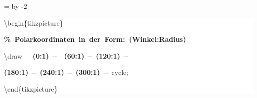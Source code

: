 \begingroup
\ttfamily
{}
=\textwidth
\advance{} by -2\fboxsep
\noindent
\colorbox{background}
{%
\parbox{\dimen255}
{%
\rule[-0.5ex]{0pt}{2.5ex}\hspace*{0.0em}\textbackslash{}begin\{tikzpicture\}\\
\rule[-0.5ex]{0pt}{2.5ex}\hspace*{1.0em}\textcolor{G}{\textbf{\%~Polarkoordinaten~in~der~Form:~(Winkel:Radius)}}\\
\rule[-0.5ex]{0pt}{2.5ex}\hspace*{1.0em}\textbackslash{}draw~~~\textcolor{R}{\textbf{(0:1)}}~{-}{-}~~\textcolor{R}{\textbf{(60:1)}}~{-}{-}~\textcolor{R}{\textbf{(120:1)}}~{-}{-}\\
\rule[-0.5ex]{0pt}{2.5ex}\hspace*{4.0em}\textcolor{R}{\textbf{(180:1)}}~{-}{-}~\textcolor{R}{\textbf{(240:1)}}~{-}{-}~\textcolor{R}{\textbf{(300:1)}}~{-}{-}~cycle;\\
\rule[-0.5ex]{0pt}{2.5ex}\hspace*{0.0em}\textbackslash{}end\{tikzpicture\}}%
}%
\endgroup
